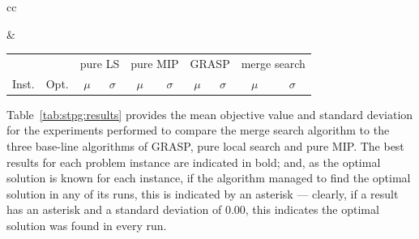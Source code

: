 \documentclass[authoryear,11pt,square,number,times,super,comma]{elsarticle}
\begin{document}
\begin{table}[h]
\begin{tabular}{cc}
\begin{adjustbox}{width=0.48\textwidth}
\end{adjustbox}
&
\centering
\begin{adjustbox}{width=0.48\textwidth}
\begin{tabular}{lrrrrrrrrr} \toprule
 &  & \multicolumn{2}{c}{pure LS} & \multicolumn{2}{c}{pure MIP} & \multicolumn{2}{c}{GRASP} & \multicolumn{2}{c}{merge search}\\
\cmidrule(lr){3-4} \cmidrule(lr){5-6} \cmidrule(lr){7-8} \cmidrule(lr){9-10} 
Inst. & Opt. & \multicolumn{1}{c}{\(\mu\)}&\multicolumn{1}{c}{\(\sigma\)} & \multicolumn{1}{c}{\(\mu\)}&\multicolumn{1}{c}{\(\sigma\)}& \multicolumn{1}{c}{\(\mu\)}&\multicolumn{1}{c}{\(\sigma\)} & \multicolumn{1}{c}{\(\mu\)}&\multicolumn{1}{c}{\(\sigma\)}\\ \midrule
%

%
\bottomrule
\end{tabular}
\end{adjustbox}

\end{tabular}
\end{table}

Table~\ref{tab:stpg:results} provides the mean objective value and standard deviation for the experiments performed to compare the merge search algorithm to the three base-line algorithms of GRASP, pure local search and pure MIP. The best results for each problem instance are indicated in bold; and, as the optimal solution is known for each instance, if the algorithm managed to find the optimal solution in any of its runs, this is indicated by an asterisk --- clearly, if a result has an asterisk and a standard deviation of 0.00, this indicates the optimal solution was found in every run.
\end{document}
